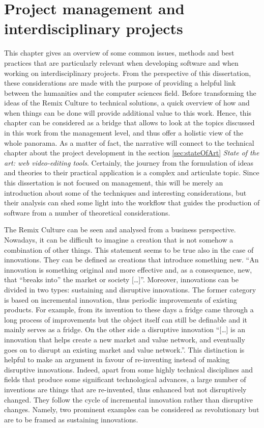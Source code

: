 \chapter{Project management and interdisciplinary projects}
\label{ch:ch2_ProjectManagement}


This chapter gives an overview of some common issues, methods and best practices that are particularly relevant when developing software and when working on interdisciplinary projects. From the perspective of this dissertation, these considerations are made with the purpose of providing a helpful link between the humanities and the computer sciences field. Before transforming the ideas of the Remix Culture to technical solutions, a quick overview of how and when things can be done will provide additional value to this work. Hence, this chapter can be considered as a bridge that allows to look at the topics discussed in this work from the management level, and thus offer a holistic view of the whole panorama. As a matter of fact, the narrative will connect to the technical chapter about the project development in the section \ref{sec:stateOfArt} \emph{State of the art: web video-editing tools}.
Certainly, the journey from the formulation of ideas and theories to their practical application is a complex and articulate topic. Since this dissertation is not focused on management, this will be merely an introduction about some of the techniques and interesting considerations, but their analysis can shed some light into the workflow that guides the production of software from a number of theoretical considerations.

The Remix Culture can be seen and analysed from a business perspective. Nowadays, it can be difficult to imagine a creation that is not somehow a combination of other things. This statement seems to be true also in the case of innovations. They can be defined as creations that introduce something new. “An innovation is something original and more effective and, as a consequence, new, that “breaks into” the market or society […]”. Moreover, innovations can be divided in two types: sustaining and disruptive innovations. The former category is based on incremental innovation, thus periodic improvements of existing products. For example, from its invention to these days a fridge came through a long process of improvements but the object itself can still be definable and it mainly serves as a fridge. On the other side a disruptive innovation “[…] is an innovation that helps create a new market and value network, and eventually goes on to disrupt an existing market and value network.”.
This distinction is helpful to make an argument in favour of re-inventing instead of making disruptive innovations. Indeed, apart from some highly technical disciplines and fields that produce some significant technological advances, a large number of inventions are things that are re-invented, thus enhanced but not disruptively changed. They follow the cycle of incremental innovation rather than disruptive changes. Namely, two prominent examples can be considered as revolutionary but are to be framed as sustaining innovations.

